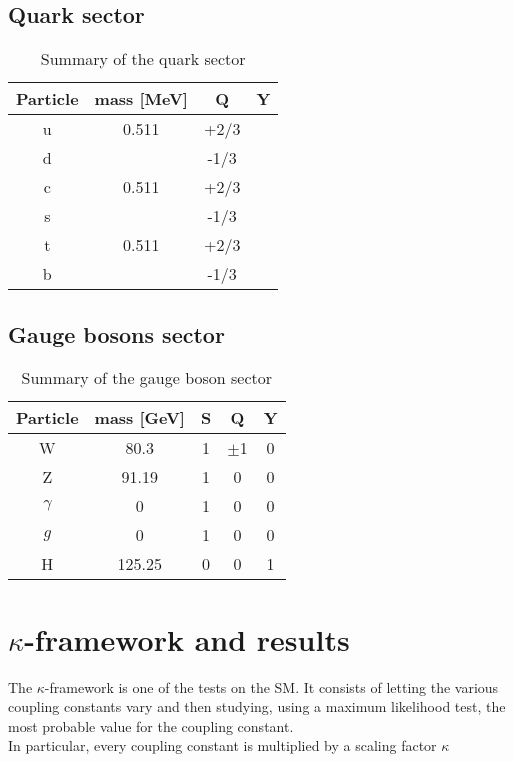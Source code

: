 \section{Quark sector}
\begin{table}[hb]
    \centering
    \begin{tabular}{c|c|c|c}
         Particle & mass [MeV] & Q &  Y \\ \hline
         u & 0.511 & +2/3  & \\ \hline
         d & & -1/3 & \\\hline
         c & 0.511 & +2/3  & \\ \hline
         s & & -1/3 & \\\hline         
         t & 0.511 & +2/3  & \\ \hline
         b & & -1/3 & \\\hline
         
 
    \end{tabular}
    \caption{Summary of the quark sector}
    \label{quark_summary}
\end{table}
\section{Gauge bosons sector}
\begin{table}[hb]
    \centering
    \begin{tabular}{c|c|c|c|c}
         Particle & mass [GeV] & S & Q  & Y \\ \hline
         W & 80.3 &1& $\pm$1 & 0 \\ \hline
         Z & 91.19 & 1 & 0 & 0 \\\hline
         $\gamma$ & 0&1 & 0 &  0\\\hline
         $g$ & 0 & 1& 0 & 0 \\\hline
         H & 125.25 & 0 & 0 & 1 \\\hline 
 
    \end{tabular}
    \caption{Summary of the gauge boson sector}
    \label{gauge_summary}
\end{table}

\chapter{$\kappa$-framework and results}
\label{kappa_framework}
The $\kappa$-framework is one of the tests on the SM. It consists of letting the various coupling constants vary and then studying, using a maximum likelihood test, the most probable value for the coupling constant.\\
In particular, every coupling constant is multiplied by a scaling factor $\kappa$